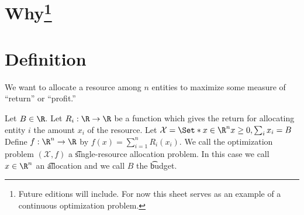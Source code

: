 

\section*{Why\footnote{Future editions will include. For now this sheet serves as an example of a continuous optimization problem.}}

\section*{Definition}

We want to allocate a resource among $n$ entities to maximize some measure of ``return'' or ``profit.''

Let $B \in \R $.
Let $R_i: \R  \to \R $ be a function which gives the return for allocating entity $i$ the amount $x_i$ of the resource.
Let $\mathcal{X}  = \Set*{x \in \R ^n}{x \geq 0, \sum_i x_i = B}$
Define $f: \R ^n \to \R $ by $f(x) = \sum_{i = 1}^{n} R_i(x_i)$.
We call the optimization problem $(\mathcal{X} , f)$ a \t{single-resource allocation problem}.
In this case we call $x \in \R ^{n}$ an \t{allocation} and we call $B$ the \t{budget}.

\blankpage